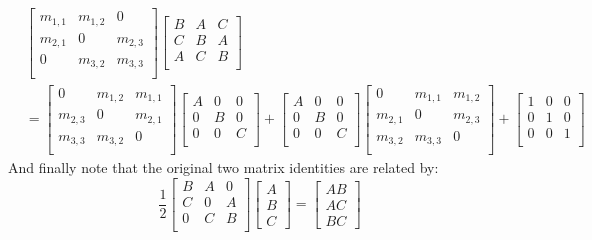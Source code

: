 \[\begin{aligned}
	&\begin{bmatrix}
		m_{1,1}&m_{1,2}&0\\
		m_{2,1}&0&m_{2,3}\\
		0&m_{3,2}&m_{3,3}\\
	\end{bmatrix}
	\begin{bmatrix}
		B&A&C\\
		C&B&A\\
		A&C&B\\
	\end{bmatrix}\\
	&=
	\begin{bmatrix}
		0&m_{1,2}&m_{1,1}\\
		m_{2,3}&0&m_{2,1}\\
		m_{3,3}&m_{3,2}&0\\
	\end{bmatrix}
	\begin{bmatrix}
		A&0&0\\
		0&B&0\\
		0&0&C\\
	\end{bmatrix}
	+\begin{bmatrix}
		A&0&0\\
		0&B&0\\
		0&0&C\\
	\end{bmatrix}
	\begin{bmatrix}
		0&m_{1,1}&m_{1,2}\\
		m_{2,1}&0&m_{2,3}\\
		m_{3,2}&m_{3,3}&0\\
	\end{bmatrix}
	+
	\begin{bmatrix}
		1&0&0\\
		0&1&0\\
		0&0&1\\
	\end{bmatrix}
\end{aligned}\]
And finally note that the original two matrix identities are related by:
\[
	\frac{1}{2}
	\begin{bmatrix}
	B&A&0\\
	C&0&A\\
	0&C&B\\
	\end{bmatrix}
	\begin{bmatrix}
	A\\B\\C
	\end{bmatrix}
	=
	\begin{bmatrix}
	AB\\AC\\BC
	\end{bmatrix}
\]
